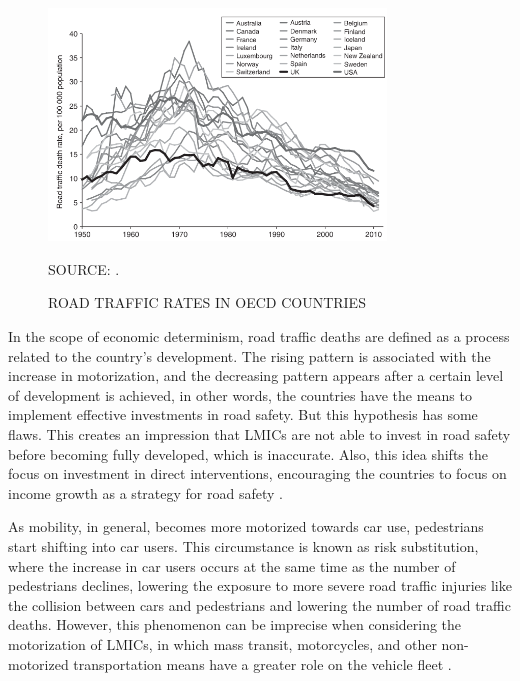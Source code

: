 \begin{figure}[!htbp]
    \centering\footnotesize
    \captionsetup{font=footnotesize}
    \caption{ROAD TRAFFIC RATES IN OECD COUNTRIES}
    \includegraphics[width=0.8\textwidth]{fig/oecd.png}
    \label{fig:oecd}
    \par SOURCE: \textcite{Bhalla2016}.
\end{figure}

In the scope of economic determinism, road traffic deaths are defined as a process related to the country's development. The rising pattern is associated with the increase in motorization, and the decreasing pattern appears after a certain level of development is achieved, in other words, the countries have the means to implement effective investments in road safety. But this hypothesis has some flaws. This creates an impression that LMICs are not able to invest in road safety before becoming fully developed, which is inaccurate. Also, this idea shifts the focus on investment in direct interventions, encouraging the countries to focus on income growth as a strategy for road safety \cite{Bhalla2016}.

As mobility, in general, becomes more motorized towards car use, pedestrians start shifting into car users. This circumstance is known as risk substitution, where the increase in car users occurs at the same time as the number of pedestrians declines, lowering the exposure to more severe road traffic injuries like the collision between cars and pedestrians and lowering the number of road traffic deaths. However, this phenomenon can be imprecise when considering the motorization of LMICs, in which mass transit, motorcycles, and other non-motorized transportation means have a greater role on the vehicle fleet \cite{Bhalla2016}.   

